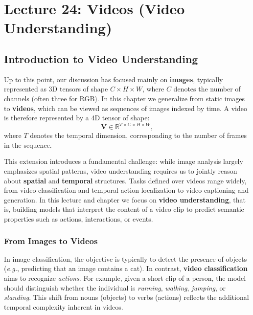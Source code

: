 
\chapter{Lecture 24: Videos (Video Understanding)}


\section{Introduction to Video Understanding}
\label{sec:chapter24_video_intro}

Up to this point, our discussion has focused mainly on \textbf{images}, typically represented as 3D tensors of shape $C \times H \times W$, where $C$ denotes the number of channels (often three for RGB). In this chapter we generalize from static images to \textbf{videos}, which can be viewed as sequences of images indexed by time. A video is therefore represented by a 4D tensor of shape:
\begin{equation}
    \label{eq:chapter24_video_tensor}
    \mathbf{V} \in \mathbb{R}^{T \times C \times H \times W},
\end{equation}
where $T$ denotes the temporal dimension, corresponding to the number of frames in the sequence.

This extension introduces a fundamental challenge: while image analysis largely emphasizes spatial patterns, video understanding requires us to jointly reason about \textbf{spatial} and \textbf{temporal} structures. Tasks defined over videos range widely, from video classification and temporal action localization to video captioning and generation. In this lecture and chapter we focus on \textbf{video understanding}, that is, building models that interpret the content of a video clip to predict semantic properties such as actions, interactions, or events.

\subsection{From Images to Videos}
\label{subsec:chapter24_from_images_to_videos}

In image classification, the objective is typically to detect the presence of objects (\emph{e.g.}, predicting that an image contains a cat). In contrast, \textbf{video classification} aims to recognize \emph{actions}. For example, given a short clip of a person, the model should distinguish whether the individual is \emph{running}, \emph{walking}, \emph{jumping}, or \emph{standing}. This shift from nouns (objects) to verbs (actions) reflects the additional temporal complexity inherent in videos.

